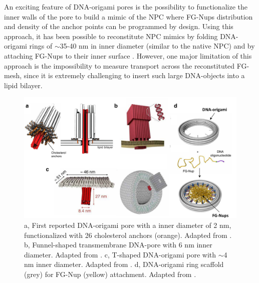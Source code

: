 An exciting feature of DNA-origami pores is the possibility to functionalize the inner walls of the pore to build a mimic of the NPC where FG-Nups distribution and density of the anchor points can be programmed by design. Using this approach, it has been possible to reconstitute NPC mimics by folding DNA-origami rings of $\sim$35-40 nm in inner diameter (similar to the native NPC) and by attaching FG-Nups to their inner surface \cite{Ketterer2018,Fisher2018}. However, one major limitation of this approach is the impossibility to measure transport across the reconstituted FG-mesh, since it is extremely challenging to insert such large DNA-objects into a lipid bilayer.

\begin{figure}[!htbp]
	\centering
	\includegraphics[width=1\linewidth]{figures/Figure1.9.pdf}
	\caption{a, First reported DNA-origami pore with a inner diameter of 2 nm, functionalized with 26 cholesterol anchors (orange). Adapted from \cite{Martin2012}. b, Funnel-shaped transmembrane DNA-pore with 6 nm inner diameter. Adapted from \cite{Gopfrich2016}. c, T-shaped DNA-origami pore with $\sim$4 nm inner diameter. Adapted from \cite{Krishnan2016}. d, DNA-origami ring scaffold (grey) for FG-Nup (yellow) attachment. Adapted from \cite{Ketterer2018}.}
	\label{fig:fig1.9}
\end{figure}



\newpage

